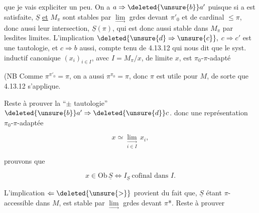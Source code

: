 
que je vais expliciter un peu. On a $a\Rightarrow\deleted{\unsure{b}}a'$ puisque  si a est satisfaite, $\underline S$ \uline{et} $M_\pi$ sont stables  par $\underset{\longrightarrow}{\lim}$ grdes devant $\pi'_0$ et de cardinal $\leq\pi$, donc aussi leur intersection, $\underline S(\pi)$, qui est donc aussi stable dans $M_\pi$ par lesdites limites.  L'implication $\deleted{\unsure{d}\Rightarrow\unsure{c}},$ $c\Rightarrow c'$  est une tautologie, et $c\Rightarrow b$ aussi, compte tenu de 4.13.12 qui nous dit que le syst. inductif canonique $(x_i)_{i\in I}$, avec $I=M_\pi/x$, de limite $x$, est $\pi_0$-$\pi$-adapté

(NB Comme $\pi^{\pi'_0}=\pi$,  on a aussi $\pi^{\pi_0}=\pi$, donc $\pi$ est utile pour $M$, \deleted{\unsure{)}} de sorte que 4.13.12 s'applique.

Reste à prouver la ``$\pm$ tautologie'' $\deleted{\unsure{b}}a'\Rightarrow\deleted{\unsure{d}}c$.   donc une représentation $\pi_0$-$\pi$-adaptée

\[
x\simeq\underset{i\in I}{\underset{\longrightarrow}{\lim}}\,x_i,
\]

prouvons que

\[
x\in\mathrm{Ob}\,\underline S\Longleftrightarrow I_{\underline S}\ \text{cofinal dans }I.
\]


L'implication $\Leftarrow\deleted{\unsure{>}}$ provient du fait que, $\underline S$ étant $\pi$-accessible dans $M$, est stable  par $\underset{\longrightarrow}{\lim}$ grdes devant $\pi$*. Reste à prouver

